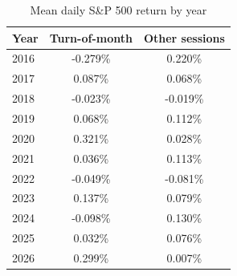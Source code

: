 \begin{table}[H]
\centering
\caption{Mean daily S\&P 500 return by year}
\begin{tabular}{lcc}
\toprule
Year & Turn-of-month & Other sessions \\
\midrule
2016 & -0.279\% & 0.220\% \\
2017 & 0.087\% & 0.068\% \\
2018 & -0.023\% & -0.019\% \\
2019 & 0.068\% & 0.112\% \\
2020 & 0.321\% & 0.028\% \\
2021 & 0.036\% & 0.113\% \\
2022 & -0.049\% & -0.081\% \\
2023 & 0.137\% & 0.079\% \\
2024 & -0.098\% & 0.130\% \\
2025 & 0.032\% & 0.076\% \\
2026 & 0.299\% & 0.007\% \\
\bottomrule
\end{tabular}
\end{table}
